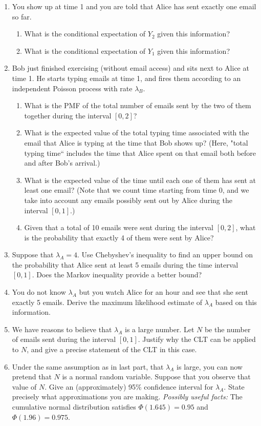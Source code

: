 \documentclass[a4paper,9pt,landscape]{extarticle}
\begin{document}
\begin{multicols*}{3}
\begin{enumerate}
\begin{enumerate}
\begin{enumerate}
		\end{enumerate}
		\item You show up at time 1 and you are told that Alice has sent exactly one email so far.
		\begin{enumerate}
			\item What is the conditional expectation of $Y_2$ given this information?
			\item What is the conditional expectation of $Y_1$ given this information?
		\end{enumerate}
		\item Bob just finished exercising (without email access) and sits next to Alice at time 1. He starts typing emails at time 1, and fires them according to an independent Poisson process with rate $\lambda_B$.
		\begin{enumerate}
			\item What is the PMF of the total number of emails sent by the two of them together during the interval $[0,2]$?
			\item What is the expected value of the total typing time associated with the email that Alice is typing at the time that Bob shows up? (Here, "total typing time`` includes the time that Alice spent on that email both before and after Bob's arrival.)
			\item What is the expected value of the time until each one of them has sent at least one email? (Note that we count time starting from time 0, and we take into account any emails possibly sent out by Alice during the interval $[0,1]$.)
			\item Given that a total of 10 emails were sent during the interval $[0,2]$, what is the probability that exactly 4 of them were sent by Alice?
		\end{enumerate}
		\item Suppose that $\lambda_A=4$. Use Chebyshev's inequality to find an upper bound on the probability that Alice sent at least 5 emails during the time interval $[0,1]$. Does the Markov inequality provide a better bound?
		\item You do not know $\lambda_A$ but you watch Alice for an hour and see that she sent exactly 5 emails. Derive the maximum likelihood estimate of $\lambda_A$ based on this information.
		\item We have reasons to believe that $\lambda_A$ is a large number. Let $N$ be the number of emails sent during the interval $[0,1]$. Justify why the CLT can be applied to $N$, and give a precise statement of the CLT in this case.
		\item Under the same assumption as in last part, that $\lambda_A$ is large, you can now pretend that $N$ is a normal random variable. Suppose that you observe that value of $N$. Give an (approximately) 95\% confidence interval for $\lambda_A$. State precisely what approximations you are making. {\it Possibly useful facts:} The cumulative normal distribution satisfies $\Phi(1.645)=0.95$ and $\Phi(1.96)=0.975$.

\end{enumerate}
\end{enumerate}
\end{multicols*}
\end{document}
